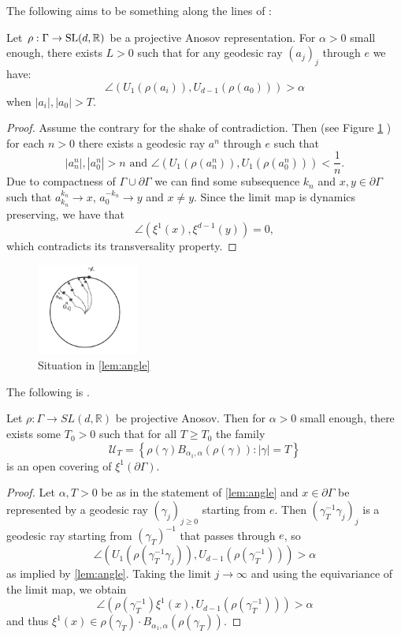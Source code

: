 \documentclass{report}
\begin{document}
The following aims to be something along the lines of \cite*[Lemma 2.4]{pozzetti_anosov_2023}:
\begin{lemma}\label{lem:angle}
    Let $\rho: \Gamma \to \operatorname{{\mathrm{SL}}}(d, \mathbb R)$ be a projective Anosov representation.
    For $\alpha > 0$ small enough, there exists $L>0$ such that for any geodesic ray $(a_j)_j$ through $e$ we have:
    \[
        \angle(U_1(\rho(a_i)), U_{d-1}(\rho(a_0))) > \alpha
    \]
    when $|a_i|, |a_0| > T$.
\end{lemma}
\begin{proof}
Assume the contrary for the shake of contradiction.
Then (see Figure \ref{fig:angle} ) for each $n>0$ there exists a geodesic ray  $a^n$ through $e$ such that 
\[
    |a_n^n|, |a_0^n| > n \text{ and }
    \angle(U_1(\rho(a_n^n)), U_1(\rho(a_0^n))) < \frac{1}{n}.
\]
Due to compactness of $\Gamma \cup \partial \Gamma$ we can find some subsequence  ${k_n}$ and $x,y \in \partial \Gamma$ such that $a^{k_n}_{k_n} \to x$, $a^{-k_n}_0 \to y$  and $x\neq y$.
Since the limit map is dynamics preserving, we have that
\[
    \angle (\xi^1(x), \xi^{d-1}(y)) = 0,
\]
which contradicts its transversality property.
\end{proof}
\begin{figure}[h]
    \centering
    \includegraphics[width=0.3\textwidth]{angle.jpg}
    \caption{Situation in \cref{lem:angle}}
    \label{fig:angle}
\end{figure}    

The following is \cite[Proposition 3.5]{pozzetti_anosov_2023}.
\begin{lemma}\label{lem:boundary_covering}
Let $\rho: \Gamma \to SL(d, \mathbb R)$ be projective Anosov.
Then for $\alpha > 0$ small enough, there exists some $T_0 > 0$ such that for all $T \geq T_0$ the family
\[
    \mathcal U_T = \left\{ \rho(\gamma) B_{\alpha_1, \alpha}(\rho(\gamma)) : |\gamma| = T \right\}
\]
is an open covering of $\xi^1(\partial \Gamma)$.
\end{lemma}
\begin{proof}
    Let $\alpha, T > 0$ be as in the statement of \cref{lem:angle} and $x \in \partial \Gamma$ be represented by a geodesic ray $(\gamma_j)_{j\geq 0}$ starting from $e$.
    Then $(\gamma_T^{-1} \gamma_j)_j$ is a geodesic ray starting from $(\gamma_T)^{-1}$ that passes through $e$, so
    \[
        \angle (U_1(\rho(\gamma_T^{-1}\gamma_j)), U_{d-1}(\rho(\gamma_T^{-1}))) > \alpha
    \]
    as implied by \cref{lem:angle}.
    Taking the limit $j \to \infty$ and using the equivariance of the limit map, we obtain
    \[
        \angle (\rho(\gamma_T^{-1})\xi^1(x), U_{d-1}(\rho(\gamma_T^{-1}))) > \alpha
    \]
    and thus $\xi^1(x) \in \rho(\gamma_T) \cdot B_{\alpha_1, \alpha}(\rho(\gamma_T))$.
\end{proof}
\end{document}
